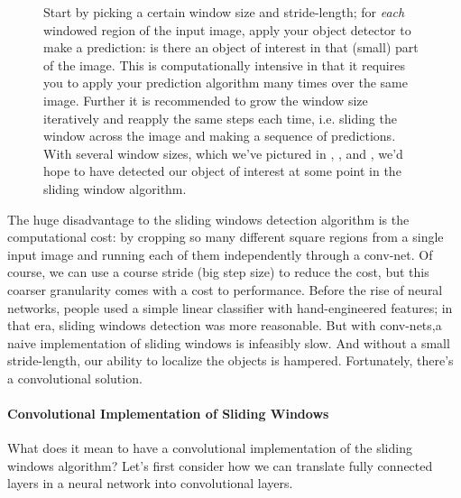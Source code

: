 \documentclass[12pt]{article}
\begin{document}
\begin{figure}[h]
  \centering
  \caption{\footnotesize Start by picking a certain window size and stride-length; for \emph{each} windowed region of the input image, apply your object detector to make a prediction: is there an object of interest in that (small) part of the image. This is computationally intensive in that it requires you to apply your prediction algorithm many times over the same image. Further it is recommended to grow the window size iteratively and reapply the same steps each time, i.e. sliding the window across the image and making a sequence of predictions. With several window sizes, which we've pictured in \color{orange}{orange}\color{black}, \color{purple}{purple}\color{black}, and \color{green}{green}\color{black}, we'd hope to have detected our object of interest at some point in the sliding window algorithm.}
\end{figure}
The huge disadvantage to the sliding windows detection algorithm is the computational cost: by cropping so many different square regions from a single input image and running each of them independently through a conv-net. Of course, we can use a course stride (big step size) to reduce the cost, but this coarser granularity comes with a cost to performance. Before the rise of neural networks, people used a simple linear classifier with hand-engineered features; in that era, sliding windows detection was more reasonable. But with conv-nets,a naive implementation of sliding windows is infeasibly slow. And without a small stride-length, our ability to localize the objects is hampered. Fortunately, there's a convolutional solution.

\paragraph{Convolutional Implementation of Sliding Windows}
What does it mean to have a convolutional implementation of the sliding windows algorithm? Let's first consider how we can translate fully connected layers in a neural network into convolutional layers.
\end{document}
